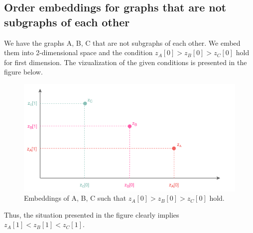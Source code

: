 \documentclass[a4paper,11pt]{article}
\begin{document}
\subsection{Order embeddings for graphs that are not subgraphs of each other}
We have the graphs A, B, C that are not subgraphs of each other. We embed them into 2-dimensional space and the condition $z_A[0] > z_B[0] > z_C[0]$ hold for first dimension.
The vizualization of the given conditions is presented in the figure below.

\begin{figure}[ht!]
    \centering
    \includegraphics[width = 130mm]{Figures/2_4.png}
    \caption{Embeddings of A, B, C such that $z_A[0] > z_B[0] > z_C[0]$ hold.}
\end{figure}\label{pic:2}
\noindent
Thus, the situation presented in the figure clearly implies $z_A[1] < z_B[1] < z_C[1]$.

\end{document}
